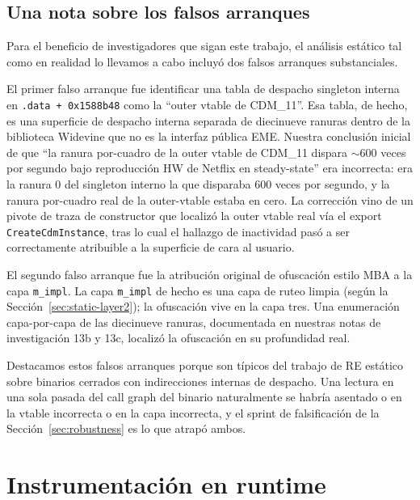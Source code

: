 \documentclass[11pt,letterpaper]{article}
\let\oldsection\section
\renewcommand{\section}{\clearpage\oldsection}
\begin{document}
\subsection{Una nota sobre los falsos arranques}
\label{sec:static-false}

Para el beneficio de investigadores que sigan este trabajo, el
análisis estático tal como en realidad lo llevamos a cabo
incluyó dos falsos arranques substanciales.

El primer falso arranque fue identificar una tabla de despacho
singleton interna en \texttt{.data + 0x1588b48} como la
``outer vtable de CDM\_11''. Esa tabla, de hecho, es una
superficie de despacho interna separada de diecinueve ranuras
dentro de la biblioteca Widevine que no es la interfaz pública
EME. Nuestra conclusión inicial de que ``la ranura por-cuadro de
la outer vtable de CDM\_11 dispara $\sim$600 veces por segundo
bajo reproducción HW de Netflix en steady-state''
era incorrecta: era la ranura 0 del singleton interno la que
disparaba 600 veces por segundo, y la ranura por-cuadro real de
la outer-vtable estaba en cero. La corrección vino de un pivote
de traza de constructor que localizó la outer vtable real vía el
export \texttt{CreateCdmInstance}, tras lo cual el hallazgo de
inactividad pasó a ser correctamente atribuible a la superficie
de cara al usuario.

El segundo falso arranque fue la atribución original de
ofuscación estilo MBA a la capa \texttt{m\_impl}. La capa
\texttt{m\_impl} de hecho es una capa de ruteo limpia (según la
Sección~\ref{sec:static-layer2}); la ofuscación vive en la capa
tres. Una enumeración capa-por-capa de las diecinueve ranuras,
documentada en nuestras notas de investigación 13b y 13c,
localizó la ofuscación en su profundidad real.

Destacamos estos falsos arranques porque son típicos del trabajo
de RE estático sobre binarios cerrados con indirecciones
internas de despacho. Una lectura en una sola pasada del call
graph del binario naturalmente se habría asentado o en la vtable
incorrecta o en la capa incorrecta, y el sprint de falsificación
de la Sección~\ref{sec:robustness} es lo que atrapó ambos.

\section{Instrumentación en runtime}
\label{sec:runtime}
\end{document}
